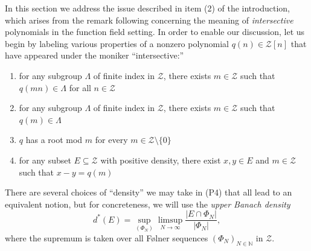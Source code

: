 \documentclass[11pt]{amsart}
\theoremstyle{theorem}
\theoremstyle{definition}
\newcommand{\N}{\mathbb{N}}
\newcommand{\mZ}{\mathcal{Z}}
\begin{document}
In this section we address the issue described in item (2) of the introduction, which arises from the remark following \cite[Theorem 9.5]{bl} concerning the meaning of \emph{intersective} polynomials in the function field setting.
In order to enable our discussion, let us begin by labeling various properties of a nonzero polynomial $q(n) \in \mZ[n]$ that have appeared under the moniker ``intersective:''
\begin{enumerate}[(P1)]
	\item	for any subgroup $\Lambda$ of finite index in $\mZ$, there exists $m \in \mZ$ such that $q(mn) \in \Lambda$ for all $n \in \mZ$
	\item	for any subgroup $\Lambda$ of finite index in $\mZ$, there exists $m \in \mZ$ such that $q(m) \in \Lambda$
	\item	$q$ has a root mod $m$ for every $m \in \mZ \setminus \{0\}$
	\item	for any subset $E \subseteq \mZ$ with positive density, there exist $x,y \in E$ and $m \in \mZ$ such that $x - y = q(m)$
\end{enumerate}

There are several choices of ``density'' we may take in (P4) that all lead to an equivalent notion, but for concreteness, we will use the \emph{upper Banach density}
\begin{equation*}
    d^*(E) = \sup_{(\Phi_N)} \limsup_{N \to \infty} \frac{|E \cap \Phi_N|}{|\Phi_N|},
\end{equation*}
where the supremum is taken over all F{\o}lner sequences $(\Phi_N)_{N \in \N}$ in $\mZ$.
\end{document}
